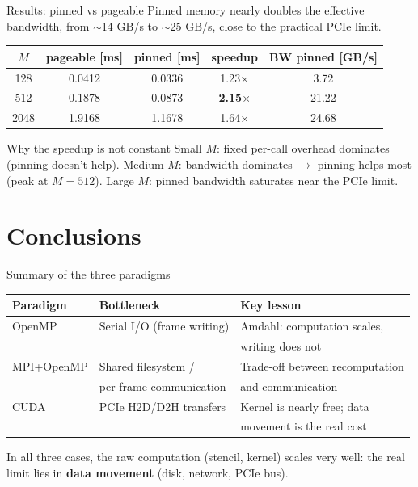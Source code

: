 \documentclass[11pt,aspectratio=169]{beamer}
\begin{document}
\begin{frame}{Results: pinned vs pageable}
  Pinned memory nearly doubles the effective bandwidth, from $\sim$14 GB/s
  to $\sim$25 GB/s, close to the practical PCIe limit.
  \vspace{0.2cm}
  \begin{table}
    \centering\small
    \begin{tabular}{ccccc}
      \toprule
      $M$ & pageable [ms] & pinned [ms] & speedup & BW pinned [GB/s] \\
      \midrule
      128  & 0.0412 & 0.0336 & 1.23$\times$ & 3.72 \\
      512  & 0.1878 & 0.0873 & \textbf{2.15$\times$} & 21.22 \\
      2048 & 1.9168 & 1.1678 & 1.64$\times$ & 24.68 \\
      \bottomrule
    \end{tabular}
  \end{table}
  \vspace{0.1cm}
  \begin{block}{Why the speedup is not constant}
    Small $M$: fixed per-call overhead dominates (pinning doesn't help).
    Medium $M$: bandwidth dominates $\to$ pinning helps most (peak at
    $M{=}512$). Large $M$: pinned bandwidth saturates near the PCIe limit.
  \end{block}
\end{frame}




\section{Conclusions}

\begin{frame}{Summary of the three paradigms}
  \begin{table}
    \centering\small
    \begin{tabular}{lll}
      \toprule
      Paradigm & Bottleneck & Key lesson \\
      \midrule
      OpenMP & Serial I/O (frame writing) & Amdahl: computation scales,
      \\ & & writing does not \\
      MPI+OpenMP & Shared filesystem / & Trade-off between recomputation\\
      & per-frame communication & and communication \\
      CUDA & PCIe H2D/D2H transfers & Kernel is nearly free; data
      \\ & & movement is the real cost \\
      \bottomrule
    \end{tabular}
  \end{table}
  \vspace{0.3cm}
  In all three cases, the raw computation (stencil, kernel) scales
  very well: the real limit lies in \textbf{data movement} (disk,
  network, PCIe bus).
\end{frame}
\end{document}
